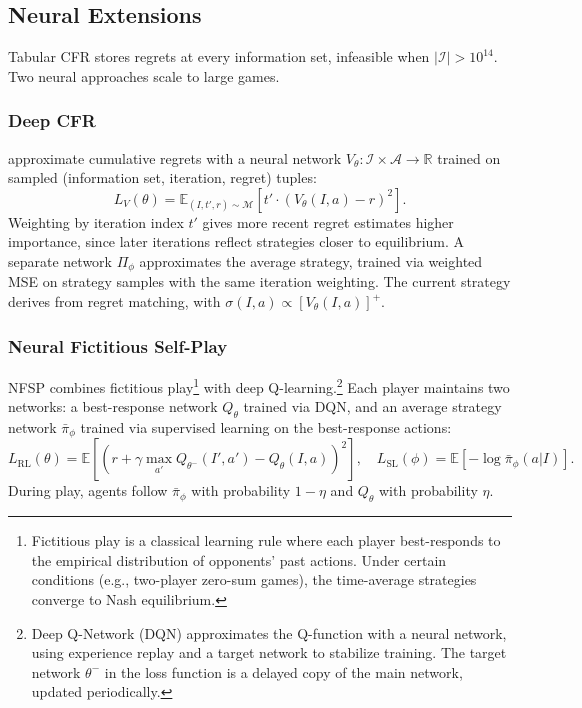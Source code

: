 \subsection{Neural Extensions}

Tabular CFR stores regrets at every information set, infeasible when $|\mathcal{I}| > 10^{14}$. Two neural approaches scale to large games.

\subsubsection{Deep CFR}

\citet{Brown2019} approximate cumulative regrets with a neural network $V_\theta: \mathcal{I} \times \mathcal{A} \to \mathbb{R}$ trained on sampled (information set, iteration, regret) tuples:
\begin{equation}
L_V(\theta) = \mathbb{E}_{(I, t', r) \sim \mathcal{M}} \left[ t' \cdot (V_\theta(I, a) - r)^2 \right].
\end{equation}
Weighting by iteration index $t'$ gives more recent regret estimates higher importance, since later iterations reflect strategies closer to equilibrium.
A separate network $\Pi_\phi$ approximates the average strategy, trained via weighted MSE on strategy samples with the same iteration weighting. The current strategy derives from regret matching, with $\sigma(I, a) \propto [V_\theta(I, a)]^+$.

\subsubsection{Neural Fictitious Self-Play}

NFSP \citep{heinrich2016deep} combines fictitious play\footnote{Fictitious play \citep{Brown1951} is a classical learning rule where each player best-responds to the empirical distribution of opponents' past actions. Under certain conditions (e.g., two-player zero-sum games), the time-average strategies converge to Nash equilibrium.} \citep{Brown1951} with deep Q-learning.\footnote{Deep Q-Network (DQN) \citep{mnih2015} approximates the Q-function with a neural network, using experience replay and a target network to stabilize training. The target network $\theta^-$ in the loss function is a delayed copy of the main network, updated periodically.} Each player maintains two networks: a best-response network $Q_\theta$ trained via DQN, and an average strategy network $\bar{\pi}_\phi$ trained via supervised learning on the best-response actions:
\begin{equation}
L_{\text{RL}}(\theta) = \mathbb{E}\left[ \left( r + \gamma \max_{a'} Q_{\theta^-}(I', a') - Q_\theta(I, a) \right)^2 \right], \quad
L_{\text{SL}}(\phi) = \mathbb{E}\left[ -\log \bar{\pi}_\phi(a | I) \right].
\end{equation}
During play, agents follow $\bar{\pi}_\phi$ with probability $1-\eta$ and $Q_\theta$ with probability $\eta$.

